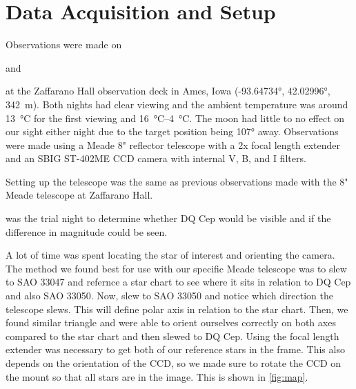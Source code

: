 \documentclass[%
aip,
jmp,
reprint,
floatfix,
nofootinbib
]{revtex4-1}
\begin{document}


	\section{Data Acquisition and Setup}
	Observations were made on \date{27 September 2017} and \date{18 October 2017} at the Zaffarano Hall observation deck in Ames, Iowa (\ang{-93.64734}, \ang{42.02996}, \SI{342}{\meter}). Both nights had clear viewing and the ambient temperature was around \SI{13}{\degreeCelsius} for the first viewing and \SIrange{16}{4}{\degreeCelsius}. The moon had little to no effect on our sight either night due to the target position being \ang{107} away. Observations were made using a Meade 8" reflector telescope with a 2x focal length extender and an SBIG ST-402ME CCD camera with internal V, B, and I filters. 
	
	Setting up the telescope was the same as previous observations made with the 8" Meade telescope at Zaffarano Hall. \date{27 September 2017} was the trial night to determine whether DQ Cep would be visible and if the difference in magnitude could be seen. 
	
	A lot of time was spent locating the star of interest and orienting the camera. The method we found best for use with our specific Meade telescope was to slew to SAO 33047 and refernce a star chart to see where it sits in relation to DQ Cep and also SAO 33050. Now, slew to SAO 33050 and notice which direction the telescope slews. This will define polar axis in relation to the star chart. Then, we found similar triangle and were able to orient ourselves correctly on both axes compared to the star chart and then slewed to DQ Cep. Using the focal length extender was necessary to get both of our reference stars in the frame. This also depends on the orientation of the CCD, so we made sure to rotate the CCD on the mount so that all stars are in the image. This is shown in \autoref{fig:map}. 
	
\end{document}
